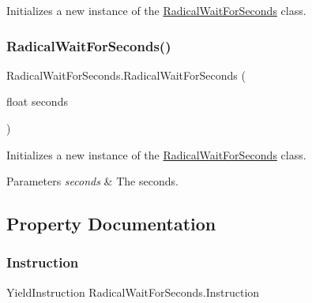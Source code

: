Initializes a new instance of the \hyperlink{class_radical_wait_for_seconds}{Radical\+Wait\+For\+Seconds} class. 

\mbox{\label{class_radical_wait_for_seconds_a94164a7e1714d2aaafb429d3d397b208}} 
\subsubsection{\texorpdfstring{Radical\+Wait\+For\+Seconds()}{RadicalWaitForSeconds()}\hspace{0.1cm}{\footnotesize\ttfamily [2/2]}}
{\footnotesize\ttfamily Radical\+Wait\+For\+Seconds.\+Radical\+Wait\+For\+Seconds (\begin{DoxyParamCaption}\item[{float}]{seconds }\end{DoxyParamCaption})\hspace{0.3cm}{\ttfamily [inline]}}



Initializes a new instance of the \hyperlink{class_radical_wait_for_seconds}{Radical\+Wait\+For\+Seconds} class. 


\begin{DoxyParams}{Parameters}
{\em seconds} & The seconds.\\
\hline
\end{DoxyParams}


\subsection{Property Documentation}
\mbox{\label{class_radical_wait_for_seconds_af83ead2c5d678ce93fb5799798e1f4d0}} 
\subsubsection{\texorpdfstring{Instruction}{Instruction}}
{\footnotesize\ttfamily Yield\+Instruction Radical\+Wait\+For\+Seconds.\+Instruction\hspace{0.3cm}{\ttfamily [get]}}



